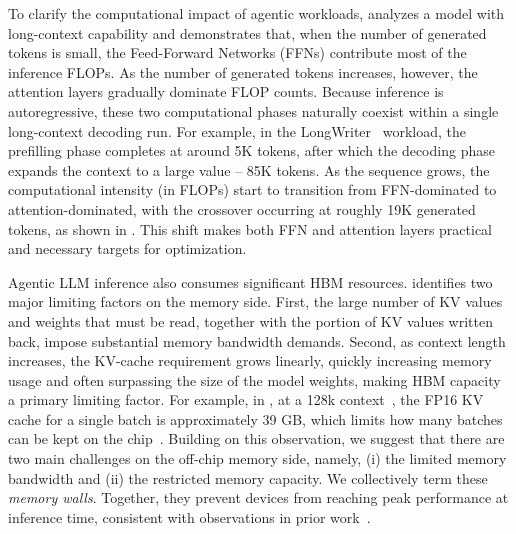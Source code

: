 To clarify the computational impact of agentic workloads,  analyzes a \llamaIIIBig model with long-context capability and demonstrates that, when the number of generated tokens is small, the Feed-Forward Networks (FFNs) contribute most of the inference FLOPs. As the number of generated tokens increases, however, the attention layers gradually dominate FLOP counts. Because inference is autoregressive, these two computational phases naturally coexist within a single long-context decoding run. For example, in the LongWriter~\cite{longwriter} workload, the prefilling phase completes at around 5K tokens, after which the decoding phase expands the context to a large value -- 85K tokens. As the sequence grows, the computational intensity (in FLOPs) start to transition from FFN-dominated to attention-dominated, with the crossover occurring at roughly 19K generated tokens, as shown in . This shift makes both FFN and attention layers practical and necessary targets for optimization.



Agentic LLM inference also consumes significant HBM resources.
 identifies two major limiting factors on the memory side. 
First, the large number of KV values and weights that must be read, together with the portion of KV values written back, impose substantial memory bandwidth demands. 
Second, as context length increases, the KV-cache requirement grows linearly, quickly increasing memory usage and often surpassing the size of the model weights, making HBM capacity a primary limiting factor.
For example, in \llamaIIIBig, at a 128k context~\cite{llama3}, the FP16 KV cache for a single batch is approximately 39 GB, which limits how many batches can be kept on the chip~\cite{AI_and_Mem_Wall}.
Building on this observation, we suggest that there are two main challenges on the off-chip memory side, namely, (i) the limited memory bandwidth and (ii) the restricted memory capacity.
We collectively term these \emph{memory walls}. Together, they prevent devices from reaching peak performance at inference time, consistent with observations in prior work~\cite{AI_and_Mem_Wall, Efficient_LLM_Inference, LLMCompass}.



